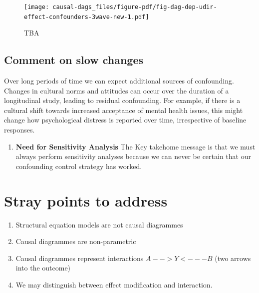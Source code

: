\documentclass[
  singlecolumn]{report}
\providecommand{\tightlist}{%
  \setlength{\itemsep}{0pt}\setlength{\parskip}{0pt}}\usepackage{longtable,booktabs,array}
\begin{document}
\begin{figure}

{\centering \texttt{[image: causal-dags\_files/figure-pdf/fig-dag-dep-udir-effect-confounders-3wave-new-1.pdf]}

}

\caption{\label{fig-dag-dep-udir-effect-confounders-3wave-new}TBA}

\end{figure}

\hypertarget{comment-on-slow-changes}{%
\subsection{Comment on slow changes}\label{comment-on-slow-changes}}

Over long periods of time we can expect additional sources of
confounding. Changes in cultural norms and attitudes can occur over the
duration of a longitudinal study, leading to residual confounding. For
example, if there is a cultural shift towards increased acceptance of
mental health issues, this might change how psychological distress is
reported over time, irrespective of baseline responses.

\begin{enumerate}
\def\labelenumi{\arabic{enumi}.}
\setcounter{enumi}{9}
\tightlist
\item
  \textbf{Need for Sensitivity Analysis} The Key takehome message is
  that we must always perform sensitivity analyses because we can never
  be certain that our confounding control strategy has worked.
\end{enumerate}

\hypertarget{stray-points-to-address}{%
\section{Stray points to address}\label{stray-points-to-address}}

\begin{enumerate}
\def\labelenumi{\arabic{enumi}.}
\tightlist
\item
  Structural equation models are not causal diagrammes
\item
  Causal diagrammes are non-parametric
\item
  Causal diagrammes represent interactions \(A -- > Y <--- B\) (two
  arrows into the outcome)
\item
  We may distinguish between effect modification and interaction.
\end{enumerate}
\end{document}
